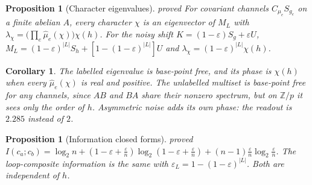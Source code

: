 \documentclass[11pt]{article}
\newtheorem{proposition}[theorem]{Proposition}
\newtheorem{corollary}[theorem]{Corollary}
\theoremstyle{definition}
\theoremstyle{remark}
\newcommand{\Z}{\mathbb{Z}}
\newcommand{\st}[1]{\textsf{\small\color{gray}#1}}
\begin{document}
\begin{proposition}[Character eigenvalues]\label{prop:eig}\st{proved}
For covariant channels $C_{\mu_e}S_{g_e}$ on a finite abelian $A$, every character $\chi$ is an eigenvector of $M_L$ with $\lambda_\chi=\big(\prod_e\hat\mu_e(\chi)\big)\chi(h)$. For the noisy shift $K=(1-\varepsilon)S_g+\varepsilon U$, $M_L=(1-\varepsilon)^{|L|}S_h+[1-(1-\varepsilon)^{|L|}]U$ and $\lambda_\chi=(1-\varepsilon)^{|L|}\chi(h)$.
\end{proposition}
\begin{corollary}
The labelled eigenvalue is base-point free, and its phase is $\chi(h)$ when every $\hat\mu_e(\chi)$ is real and positive. The unlabelled multiset is base-point free for \emph{any} channels, since $AB$ and $BA$ share their nonzero spectrum, but on $\Z/p$ it sees only the order of $h$. Asymmetric noise adds its own phase: the readout is $2.285$ instead of $2$.
\end{corollary}
\begin{proposition}[Information closed forms]\st{proved}
$I(c_a;c_b)=\log_2n+(1-\varepsilon+\tfrac\varepsilon n)\log_2(1-\varepsilon+\tfrac\varepsilon n)+(n-1)\tfrac\varepsilon n\log_2\tfrac\varepsilon n$. The loop-composite information is the same with $\varepsilon_L=1-(1-\varepsilon)^{|L|}$. Both are independent of $h$.
\end{proposition}
\end{document}
